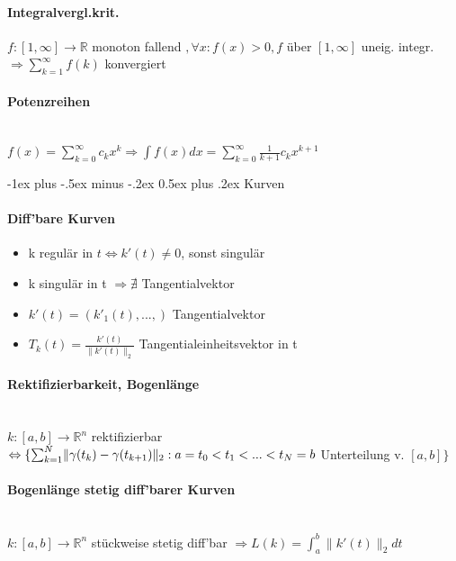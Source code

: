 \documentclass[paper=a3,paper=landscape, fontsize=9pt, DIV=30]{scrartcl}
\makeatletter
\newcommand{\real}{{\mathbb{R}}}
\renewcommand{\section}{\@startsection{section}{1}{0mm}%
  {-1ex plus -.5ex minus -.2ex}%
  {0.5ex plus .2ex}%
  {\color{blue}\normalfont\large\bfseries}}
\makeatother
\begin{document}
\begin{multicols*}{4}
  \paragraph{Integralvergl.krit.}
  $f:[1,\infty]\rightarrow\real$ monoton fallend $, \forall x: f(x)>0, f$ über $[1,\infty]$ uneig. integr. $\Rightarrow \sum_{k=1}^{\infty}f(k)$ konvergiert


  \paragraph{Potenzreihen}\hspace{0pt} \\
  $f(x)=\sum_{k=0}^{\infty}c_kx^k \Rightarrow \int f(x)dx=\sum_{k=0}^{\infty}\frac{1}{k+1}c_kx^{k+1}$



  \section{Kurven}
  \paragraph{Diff'bare Kurven}
  \begin{itemize}
  \item k regulär in $t \Leftrightarrow k'(t) \neq 0$, sonst singulär
  \item k singulär in t $\Rightarrow \nexists$ Tangentialvektor
  \item $k'(t)=(k'_1(t),...,)$ Tangentialvektor
  \item $T_k(t)=\frac{k'(t)}{\lVert k'(t)\rVert_2}$ Tangentialeinheitsvektor in t
  \end{itemize}


  \paragraph{Rektifizierbarkeit, Bogenlänge}\hspace{0pt} \\
  $k:[a,b]\rightarrow \real^n$ rektifizierbar $\Leftrightarrow \{\sum_{k=1}^{N}\lVert\gamma(t_k)-\gamma(t_{k+1})\rVert_2:\\
  a = t_0 < t_1 < ... < t_N = b$ Unterteilung v. $[a,b]\}$


  \paragraph{Bogenlänge stetig diff'barer Kurven}\hspace{0pt} \\
  $k: [a,b]\rightarrow \real^n$ stückweise stetig diff'bar $\Rightarrow L(k)=\int_{a}^{b}\lVert k'(t)\rVert_2 dt$


\end{multicols*}
\end{document}
